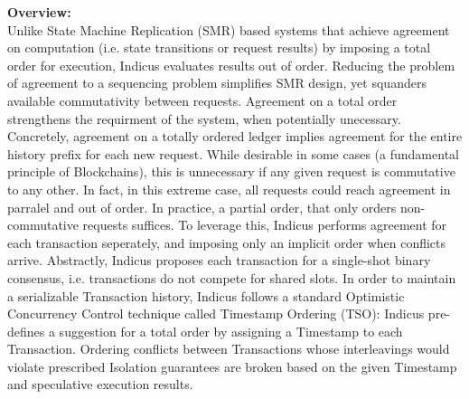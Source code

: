 \textbf{Overview:}\\
Unlike State Machine Replication (SMR) based systems that achieve agreement on computation (i.e. state transitions or request results) by imposing a total order for execution, Indicus evaluates results out of order. Reducing the problem of agreement to a sequencing problem simplifies SMR design, yet squanders available commutativity between requests.  Agreement on a total order strengthens the requirment of the system, when potentially unecessary. Concretely, agreement on a totally ordered ledger implies agreement for the entire history prefix for each new request. While desirable in some cases (a fundamental principle of Blockchains), this is unnecessary if any given request is commutative to any other. In fact, in this extreme case, all requests could reach agreement in parralel and out of order. In practice, a partial order, that only orders non-commutative requests suffices.
 To leverage this, Indicus performs agreement for each transaction seperately, and imposing only an implicit order when conflicts arrive. Abstractly, Indicus proposes each transaction for a single-shot binary consensus, i.e. transactions do not compete for shared slots. In order to maintain a serializable Transaction history, Indicus follows a standard Optimistic Concurrency Control technique called Timestamp Ordering (TSO): Indicus pre-defines a suggestion for a total order by assigning a Timestamp to each Transaction. Ordering conflicts between Transactions whose interleavings would violate prescribed Isolation guarantees are broken based on the given Timestamp and speculative execution results.


